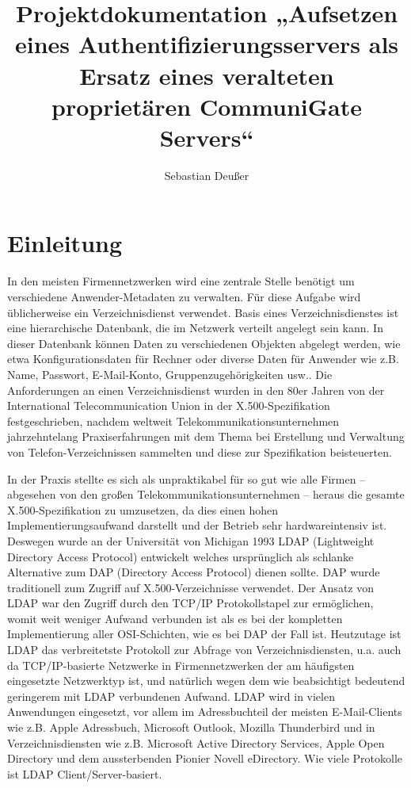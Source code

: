 \documentclass[11pt,a4paper,titlepage=firstiscover,headsepline,bibtotoc]{scrartcl} %
\title{Projektdokumentation „Aufsetzen eines Authentifizierungsservers als Ersatz eines veralteten proprietären CommuniGate Servers“}
\author{Sebastian Deußer}
\begin{document}
\pagestyle{empty}
\maketitle %

\tableofcontents
\newpage
\setcounter{page}{1}  %
\pagestyle{scrheadings}

\section{Einleitung}
In den meisten Firmennetzwerken wird eine zentrale Stelle benötigt um verschiedene Anwender-Metadaten zu verwalten. Für diese Aufgabe wird üblicherweise ein Verzeichnisdienst verwendet. Basis eines Verzeichnisdienstes ist eine hierarchische Datenbank, die im Netzwerk verteilt angelegt sein kann. In dieser Datenbank können Daten zu verschiedenen Objekten abgelegt werden, wie etwa Konfigurationsdaten für Rechner oder diverse Daten für Anwender wie z.B. Name, Passwort, E-Mail-Konto, Gruppenzugehörigkeiten usw.. Die Anforderungen an einen Verzeichnisdienst wurden in den 80er Jahren von der International Telecommunication Union in der X.500-Spezifikation festgeschrieben, nachdem weltweit Telekommunikationsunternehmen jahrzehntelang Praxiserfahrungen mit dem Thema bei Erstellung und Verwaltung von Telefon-Verzeichnissen sammelten und diese zur Spezifikation beisteuerten.

In der Praxis stellte es sich als unpraktikabel für so gut wie alle Firmen -- abgesehen von den großen Telekommunikationsunternehmen -- heraus die gesamte X.500-Spezifikation zu umzusetzen, da dies einen hohen Implementierungsaufwand darstellt und der Betrieb sehr hardwareintensiv ist. Deswegen wurde an der Universität von Michigan 1993 LDAP (Lightweight Directory Access Protocol) entwickelt welches ursprünglich als schlanke Alternative zum DAP (Directory Access Protocol) dienen sollte. DAP wurde traditionell zum Zugriff auf X.500-Verzeichnisse verwendet. Der Ansatz von LDAP war den Zugriff durch den TCP/IP Protokollstapel zur ermöglichen, womit weit weniger Aufwand verbunden ist als es bei der kompletten Implementierung aller OSI-Schichten, wie es bei DAP der Fall ist. Heutzutage ist LDAP das verbreitetste Protokoll zur Abfrage von Verzeichnisdiensten, u.a. auch da TCP/IP-basierte Netzwerke in Firmennetzwerken der am häufigsten eingesetzte Netzwerktyp ist, und natürlich wegen dem wie beabsichtigt bedeutend geringerem mit LDAP verbundenen Aufwand. LDAP wird in vielen Anwendungen eingesetzt, vor allem im Adressbuchteil der meisten E-Mail-Clients wie z.B. Apple Adressbuch, Microsoft Outlook, Mozilla Thunderbird und in Verzeichnisdiensten wie z.B. Microsoft Active Directory Services, Apple Open Directory und dem aussterbenden Pionier Novell eDirectory. Wie viele Protokolle ist LDAP Client/Server-basiert.
\end{document}
